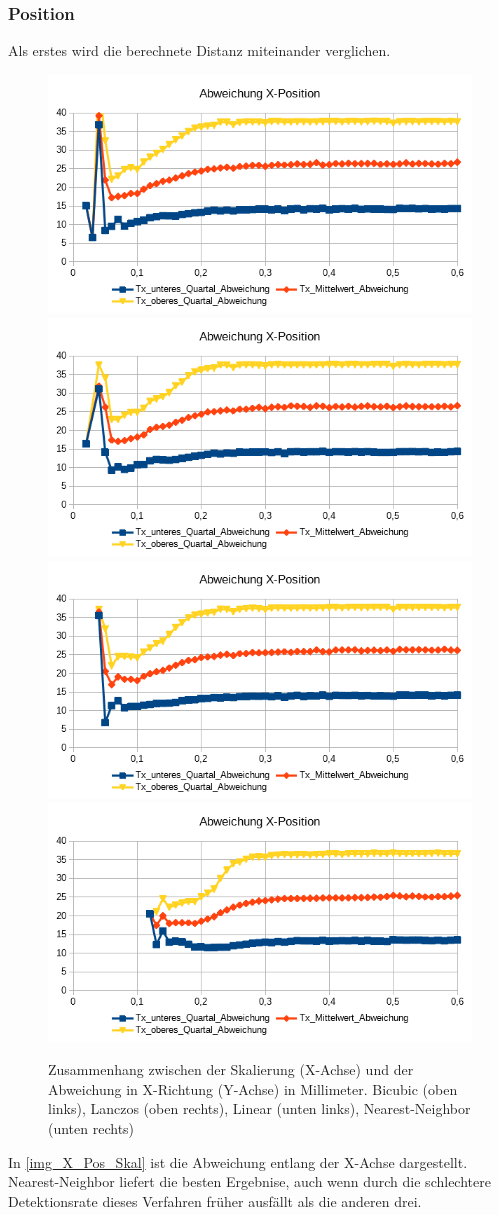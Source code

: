 \subsubsection{Position}
Als erstes wird die berechnete Distanz miteinander verglichen.
\begin{figure}
	\centering
	\includegraphics[width=0.45\linewidth]{tabelle2/X_Pos_Cubic}
	\includegraphics[width=0.45\linewidth]{tabelle2/X_Pos_Lanc}
	\includegraphics[width=0.45\linewidth]{tabelle2/X_Pos_Linear}
	\includegraphics[width=0.45\linewidth]{tabelle2/X_Pos_NN}
	\caption{Zusammenhang zwischen der Skalierung (X-Achse) und der Abweichung in X-Richtung (Y-Achse) in Millimeter. 
	 Bicubic (oben links), Lanczos (oben rechts), Linear (unten links), Nearest-Neighbor (unten rechts)}
	\label{img_X_Pos_Skal}
\end{figure}
 In \autoref{img_X_Pos_Skal} ist die Abweichung entlang der X-Achse dargestellt. Nearest-Neighbor liefert die besten Ergebnise, auch wenn durch die schlechtere Detektionsrate dieses Verfahren früher ausfällt als die anderen drei.\\
